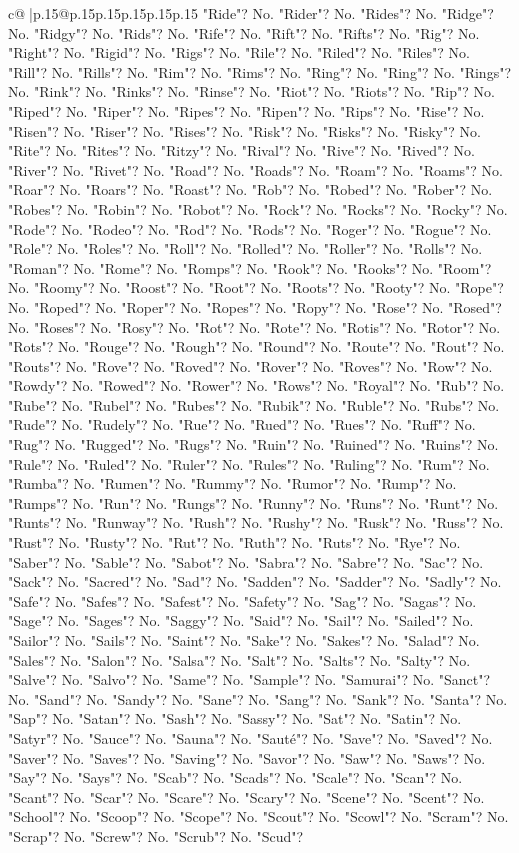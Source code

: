 \documentclass{article}
\begin{document}
{\begin{supertabular}{c@{$\;$}|p{.15\linewidth}@{}p{.15\linewidth}p{.15\linewidth}p{.15\linewidth}p{.15\linewidth}p{.15\linewidth}}
{{{"Ride"? No. "Rider"? No. "Rides"? No. "Ridge"? No. "Ridgy"? No. "Rids"? No. "Rife"? No. "Rift"? No. "Rifts"? No. "Rig"? No. "Right"? No. "Rigid"? No. "Rigs"? No. "Rile"? No. "Riled"? No. "Riles"? No. "Rill"? No. "Rills"? No. "Rim"? No. "Rims"? No. "Ring"? No. "Ring"? No. "Rings"? No. "Rink"? No. "Rinks"? No. "Rinse"? No. "Riot"? No. "Riots"? No. "Rip"? No. "Riped"? No. "Riper"? No. "Ripes"? No. "Ripen"? No. "Rips"? No. "Rise"? No. "Risen"? No. "Riser"? No. "Rises"? No. "Risk"? No. "Risks"? No. "Risky"? No. "Rite"? No. "Rites"? No. "Ritzy"? No. "Rival"? No. "Rive"? No. "Rived"? No. "River"? No. "Rivet"? No. "Road"? No. "Roads"? No. "Roam"? No. "Roams"? No. "Roar"? No. "Roars"? No. "Roast"? No. "Rob"? No. "Robed"? No. "Rober"? No. "Robes"? No. "Robin"? No. "Robot"? No. "Rock"? No. "Rocks"? No. "Rocky"? No. "Rode"? No. "Rodeo"? No. "Rod"? No. "Rods"? No. "Roger"? No. "Rogue"? No. "Role"? No. "Roles"? No. "Roll"? No. "Rolled"? No. "Roller"? No. "Rolls"? No. "Roman"? No. "Rome"? No. "Romps"? No. "Rook"? No. "Rooks"? No. "Room"? No. "Roomy"? No. "Roost"? No. "Root"? No. "Roots"? No. "Rooty"? No. "Rope"? No. "Roped"? No. "Roper"? No. "Ropes"? No. "Ropy"? No. "Rose"? No. "Rosed"? No. "Roses"? No. "Rosy"? No. "Rot"? No. "Rote"? No. "Rotis"? No. "Rotor"? No. "Rots"? No. "Rouge"? No. "Rough"? No. "Round"? No. "Route"? No. "Rout"? No. "Routs"? No. "Rove"? No. "Roved"? No. "Rover"? No. "Roves"? No. "Row"? No. "Rowdy"? No. "Rowed"? No. "Rower"? No. "Rows"? No. "Royal"? No. "Rub"? No. "Rube"? No. "Rubel"? No. "Rubes"? No. "Rubik"? No. "Ruble"? No. "Rubs"? No. "Rude"? No. "Rudely"? No. "Rue"? No. "Rued"? No. "Rues"? No. "Ruff"? No. "Rug"? No. "Rugged"? No. "Rugs"? No. "Ruin"? No. "Ruined"? No. "Ruins"? No. "Rule"? No. "Ruled"? No. "Ruler"? No. "Rules"? No. "Ruling"? No. "Rum"? No. "Rumba"? No. "Rumen"? No. "Rummy"? No. "Rumor"? No. "Rump"? No. "Rumps"? No. "Run"? No. "Rungs"? No. "Runny"? No. "Runs"? No. "Runt"? No. "Runts"? No. "Runway"? No. "Rush"? No. "Rushy"? No. "Rusk"? No. "Russ"? No. "Rust"? No. "Rusty"? No. "Rut"? No. "Ruth"? No. "Ruts"? No. "Rye"? No. "Saber"? No. "Sable"? No. "Sabot"? No. "Sabra"? No. "Sabre"? No. "Sac"? No. "Sack"? No. "Sacred"? No. "Sad"? No. "Sadden"? No. "Sadder"? No. "Sadly"? No. "Safe"? No. "Safes"? No. "Safest"? No. "Safety"? No. "Sag"? No. "Sagas"? No. "Sage"? No. "Sages"? No. "Saggy"? No. "Said"? No. "Sail"? No. "Sailed"? No. "Sailor"? No. "Sails"? No. "Saint"? No. "Sake"? No. "Sakes"? No. "Salad"? No. "Sales"? No. "Salon"? No. "Salsa"? No. "Salt"? No. "Salts"? No. "Salty"? No. "Salve"? No. "Salvo"? No. "Same"? No. "Sample"? No. "Samurai"? No. "Sanct"? No. "Sand"? No. "Sandy"? No. "Sane"? No. "Sang"? No. "Sank"? No. "Santa"? No. "Sap"? No. "Satan"? No. "Sash"? No. "Sassy"? No. "Sat"? No. "Satin"? No. "Satyr"? No. "Sauce"? No. "Sauna"? No. "Sauté"? No. "Save"? No. "Saved"? No. "Saver"? No. "Saves"? No. "Saving"? No. "Savor"? No. "Saw"? No. "Saws"? No. "Say"? No. "Says"? No. "Scab"? No. "Scads"? No. "Scale"? No. "Scan"? No. "Scant"? No. "Scar"? No. "Scare"? No. "Scary"? No. "Scene"? No. "Scent"? No. "School"? No. "Scoop"? No. "Scope"? No. "Scout"? No. "Scowl"? No. "Scram"? No. "Scrap"? No. "Screw"? No. "Scrub"? No. "Scud"? }}}
\end{supertabular}}
\end{document}

